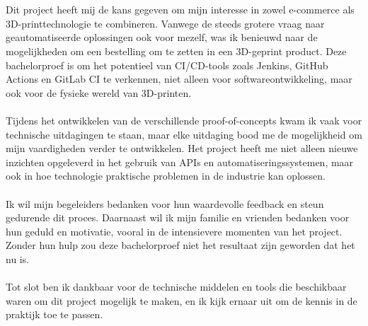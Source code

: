 
\chapter*{}%
\label{ch:voorwoord}


Dit project heeft mij de kans gegeven om mijn interesse in zowel e-commerce als 3D-printtechnologie te combineren. Vanwege de steeds grotere vraag naar geautomatiseerde oplossingen ook voor mezelf, was ik benieuwd naar de mogelijkheden om een bestelling om te zetten in een 3D-geprint product. Deze bachelorproef is om het potentieel van CI/CD-tools zoals Jenkins, GitHub Actions en GitLab CI te verkennen, niet alleen voor softwareontwikkeling, maar ook voor de fysieke wereld van 3D-printen.
\\\\
Tijdens het ontwikkelen van de verschillende proof-of-concepts kwam ik vaak voor technische uitdagingen te staan, maar elke uitdaging bood me de mogelijkheid om mijn vaardigheden verder te ontwikkelen. Het project heeft me niet alleen nieuwe inzichten opgeleverd in het gebruik van APIs en automatiseringssystemen, maar ook in hoe technologie praktische problemen in de industrie kan oplossen.
\\\\
Ik wil mijn begeleiders bedanken voor hun waardevolle feedback en steun gedurende dit proces. Daarnaast wil ik mijn familie en vrienden bedanken voor hun geduld en motivatie, vooral in de intensievere momenten van het project. Zonder hun hulp zou deze bachelorproef niet het resultaat zijn geworden dat het nu is.
\\\\
Tot slot ben ik dankbaar voor de technische middelen en tools die beschikbaar waren om dit project mogelijk te maken, en ik kijk ernaar uit om de kennis in de praktijk toe te passen.

